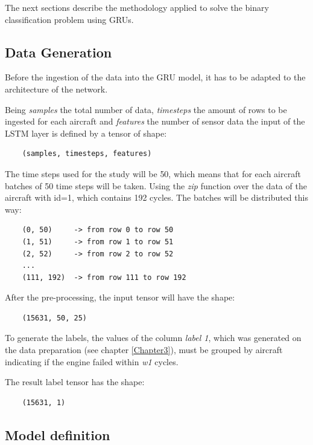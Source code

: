 The next sections describe the methodology applied to solve the binary classification problem using GRUs.

\subsection{Data Generation}

Before the ingestion of the data into the GRU model, it has to be adapted to the architecture of the network.

Being \textit{samples} the total number of data, \textit{timesteps} the amount of rows to be ingested for each aircraft and \textit{features} the number of sensor data the input of the LSTM layer is defined by a tensor of shape:

\begin{verbatim}
    (samples, timesteps, features)
\end{verbatim}

The time steps used for the study will be 50, which means that for each aircraft batches of 50 time steps will be taken.
Using the \textit{zip} function over the data of the aircraft with id=1, which contains 192 cycles. The batches will be distributed this way:

\begin{verbatim}
    (0, 50)     -> from row 0 to row 50
    (1, 51)     -> from row 1 to row 51
    (2, 52)     -> from row 2 to row 52
    ...
    (111, 192)  -> from row 111 to row 192
\end{verbatim}

After the pre-processing, the input tensor will have the shape:

\begin{verbatim}
    (15631, 50, 25)
\end{verbatim}

To generate the labels, the values of the column \textit{label 1}, which was generated on the data preparation (see chapter \ref{Chapter3}), must be grouped by aircraft indicating if the engine failed within \textit{w1} cycles.

The result label tensor has the shape:

\begin{verbatim}
    (15631, 1)
\end{verbatim}


\subsection{Model definition}

